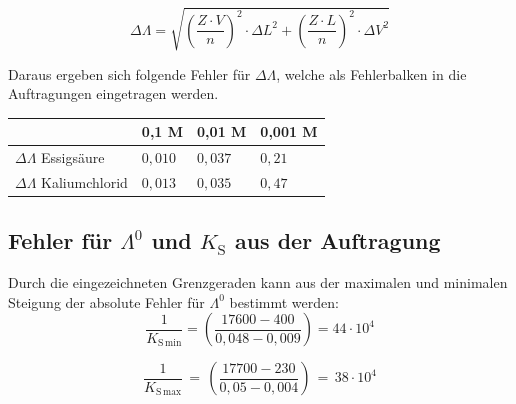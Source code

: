 \documentclass[12pt,a4paper,titlepage,headinclude,bibtotoc]{scrartcl}
\begin{document}



\begin{equation}
\Delta \Lambda = \sqrt{\left(\frac{Z \cdot V}{n}\right)^2 \cdot {\Delta L}^2 + \left(\frac{Z \cdot L}{n}\right)^2 \cdot \Delta V^2}
\end{equation}

Daraus ergeben sich folgende Fehler für $\Delta \Lambda$, welche als Fehlerbalken in die Auftragungen eingetragen werden.\\

\begin{table} [h]
\centering 
\begin{tabular}{|p{4cm}||p{3cm}|p{3cm}|p{3cm}|}
\hline
& 0,1 M & 0,01 M & 0,001 M \\
\hline
$\Delta \Lambda$ Essigsäure  & $0,010$ & $0,037$& $0,21$ \\
\hline
$\Delta \Lambda$ Kaliumchlorid &$0,013$ & $0,035$ & $0,47$ \\
\hline
\end{tabular}
\end{table}







\subsection{Fehler für $\Lambda^0$ und $K_{\mathrm{S}}$ aus der Auftragung}

Durch die eingezeichneten Grenzgeraden kann aus der maximalen und minimalen Steigung der absolute Fehler für $\Lambda^0$ bestimmt werden:\\


\begin{equation}
\frac{1}{K_{\mathrm{S}\,\mathrm{min}}} =\left( \frac{17600-400}{0,048-0,009} \right)= 44\cdot 10^4
\end{equation}

\begin{equation}
\frac{1}{K_{\mathrm{S}\,\mathrm{max}}}\,=\,\left(\frac{17700-230}{0,05-0,004}\right)\,=\, 38 \cdot 10^4
\end{equation}
\end{document}
